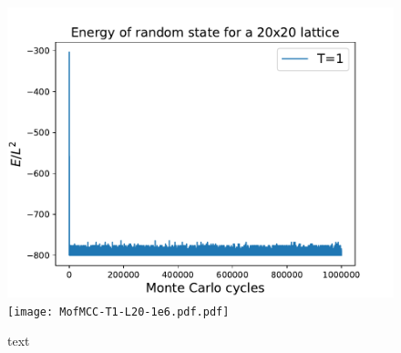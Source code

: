 \documentclass{emulateapj}
\begin{document}
\begin{figure}[H]
{{\includegraphics[scale=0.53]{EofMCC-T1-L20-1e6.pdf}}
}\qquad
{{\texttt{[image: MofMCC-T1-L20-1e6.pdf.pdf]}}
}\qquad
\caption{text}
\label{fig:GS}
\end{figure}
\end{document}
